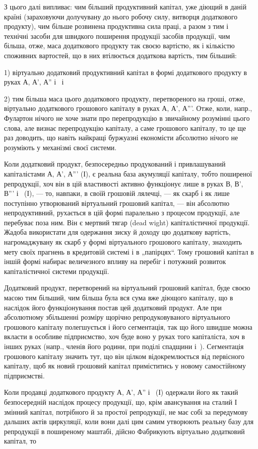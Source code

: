 
З цього далі випливає: чим більший продуктивний капітал, уже
діющий в даній країні (зараховуючи долучувану до нього робочу силу,
витворця додаткового продукту), чим більше розвинена продуктивна сила
праці, а разом з тим і технічні засоби для швидкого поширення продукції
засобів продукції, чим більша, отже, маса додаткового продукту
так своєю вартістю, як і кількістю споживних вартостей, що в них
втілюється додаткова вартість, тим більший:

1) віртуально додатковий продуктивний капітал в формі додаткового
продукту в руках А, А', А'' і~ і

2) тим більша маса цього додаткового продукту, перетвореного на
гроші, отже, віртуально додаткового грошового капіталу в руках А, А', А'''.
Отже, коли, напр., Фулартон нічого не хоче знати про перепродукцію
в звичайному розумінні цього слова, але визнає перепродукцію капіталу,
а саме грошового капіталу, то це ще раз доводить, що навіть найкращі
буржуазні економісти абсолютно нічого не розуміють у механізмі своєї
системи.

Коли додатковий продукт, безпосередньо продукований і привлашуваний
капіталістами А, А', А''' (І), є реальна база акумуляції капіталу,
тобто поширеної репродукції, хоч він в цій властивості активно функціонує
лише в руках В, В', В''' і~ (І), — то, навпаки, в своїй грошовій
лялечці, — як скарб і як лише поступінно утворюваний віртуальний
грошовий капітал, — він абсолютно непродуктивний, рухається
в цій формі паралельно з процесом продукції, але перебуває поза ним.
Він є мертвий тягар (dead wight) капіталістичної продукції. Жадоба використати
для одержання зиску й доходу цю додаткову вартість, нагромаджувану
як скарб у формі віртуального грошового капіталу, знаходить
мету своїх прагнень в кредитовій системі і в „папірцях“. Тому грошовий
капітал в іншій формі набирає величезного впливу на перебіг і потужний
розвиток капіталістичної системи продукції.

Додатковий продукт, перетворений на віртуальний грошовий капітал,
буде своєю масою тим більший, чим більша була вся сума вже діющого
капіталу, що в наслідок його функціонування постав цей додатковий
продукт. Але при абсолютному збільшенні розміру щорічно репродуковуваного
віртуального грошового капіталу полегшується і його сегментація,
так що його швидше можна вкласти в особливе підприємство, хоч буде
воно у руках того капіталіста, хоч в інших руках (напр., членів його родини,
при поділі спадщини і~). Сегментація грошового капіталу значить
тут, що він цілком відокремлюється від первісного капіталу, щоб як
новий грошовий капітал приміститись у новому самостійному підприємстві.

Коли продавці додаткового продукту А, А', А'' і~ (І) одержали
його як такий безпосередній наслідок процесу продукції, що, крім авансування
на сталий І змінний капітал, потрібного й за простої репродукції,
не має собі за передумову дальших актів циркуляції, коли вони
далі цим самим утворюють реальну базу для репродукції в поширеному
маштабі, дійсно Фабрикують віртуально додатковий капітал, то
\parbreak{}  %
